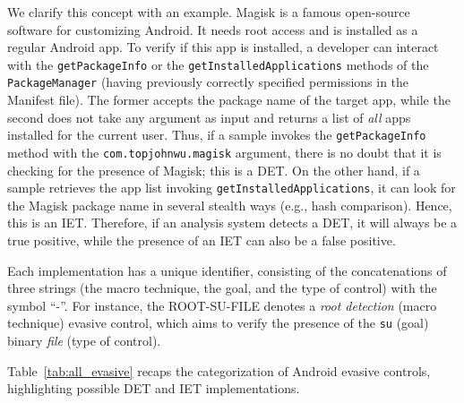 We clarify this concept with an example.
Magisk is a famous open-source software for customizing Android. 
It needs root access and is installed as a regular Android app.
To verify if this app is installed, a developer can interact with the \texttt{getPackageInfo} or the \texttt{getInstalledApplications} methods of the \texttt{PackageManager} (having previously correctly specified permissions in the Manifest file).
The former accepts the package name of the target app, while the second does not take any argument as input and returns a list of \textit{all} apps installed for the current user.
Thus, if a sample invokes the \texttt{getPackageInfo} method with the \texttt{com.topjohnwu.magisk} argument, there is no doubt that it is checking for the presence of Magisk; this is a DET. 
On the other hand, if a sample retrieves the app list invoking \texttt{getInstalledApplications}, it can look for the Magisk package name in several stealth ways (e.g., hash comparison). Hence, this is an IET.
Therefore, if an analysis system detects a DET, it will always be a true positive, while the presence of an IET can also be a false positive. 

Each implementation has a unique identifier, consisting of the concatenations of three strings (the macro technique, the goal, and the type of control) with the symbol ``-''. %
For instance, the ROOT-SU-FILE denotes a \textit{root detection} (macro technique) evasive control, which aims to verify the presence of the \texttt{su} (goal) binary \textit{file} (type of control). 

Table~\ref{tab:all_evasive} recaps the categorization of Android evasive controls, highlighting possible DET and IET implementations. 



